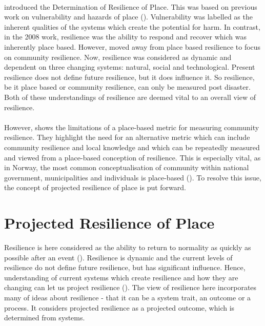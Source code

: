 \paragraph{}


\cite{cutter_place-based_2008} introduced the Determination of Resilience of Place. This was based on previous work on vulnerability and hazards of place (\cite{cutter_vulnerability_1996}).  Vulnerability was labelled as the inherent qualities of the systems which create the potential for harm.
In contrast, in the 2008 work, resilience was the ability to respond and recover which was inherently place based. However, \cite{cutter_community_2020} moved away from place based resilience to focus on community resilience. Now, resilience was considered as dynamic and dependent on three changing systems: natural, social and technological. Present resilience does not define future resilience, but it does influence it. So resilience, be it place based or community resilience, can only be measured post disaster. Both of these understandings of resilience are deemed vital to an overall view of resilience.
\paragraph{}

However, \cite{rasanen_conceptualizing_2020} shows the limitations of a place-based metric for measuring community resilience. They highlight the need for an alternative metric which can include community resilience and local knowledge and which can be repeatedly measured and viewed from a place-based conception of resilience. This is especially vital, as in Norway, the most common conceptualisation of community within national government, municipalities and individuals is place-based (\cite{rasanen_conceptualizing_2020}). To resolve this issue, the concept of projected resilience of place is put forward. 




\section{Projected Resilience of Place} 
\label{theory-resilience}
Resilience is here considered as the ability to return to normality as quickly as possible after an event (\cite{cutter_place-based_2008}). Resilience is dynamic and the current levels of resilience do not define future resilience, but has significant influence. Hence, understanding of current systems which create resilience and how they are changing can let us project resilience (\cite{cutter_community_2020}). The view of resilience here incorporates many of \cite{moser_turbulent_2019} ideas about resilience -  that it can be a system trait, an outcome or a process. It considers projected resilience as a projected outcome, which is determined from systems. 

